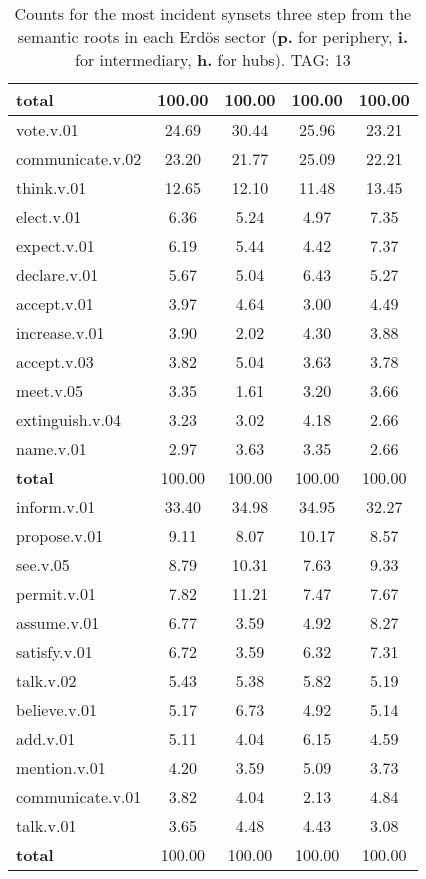 \begin{table}[h!]
\begin{center}
\begin{tabular}{| l || c | c | c | c |}
{{\bf total}} & 100.00  & 100.00  & 100.00  & 100.00 \\\hline\hline\hline
vote.v.01 & 24.69  & 30.44  & 25.96  & 23.21 \\\hline
communicate.v.02 & 23.20  & 21.77  & 25.09  & 22.21 \\\hline
think.v.01 & 12.65  & 12.10  & 11.48  & 13.45 \\\hline
elect.v.01 & 6.36  & 5.24  & 4.97  & 7.35 \\\hline
expect.v.01 & 6.19  & 5.44  & 4.42  & 7.37 \\\hline
declare.v.01 & 5.67  & 5.04  & 6.43  & 5.27 \\\hline
accept.v.01 & 3.97  & 4.64  & 3.00  & 4.49 \\\hline
increase.v.01 & 3.90  & 2.02  & 4.30  & 3.88 \\\hline
accept.v.03 & 3.82  & 5.04  & 3.63  & 3.78 \\\hline
meet.v.05 & 3.35  & 1.61  & 3.20  & 3.66 \\\hline
extinguish.v.04 & 3.23  & 3.02  & 4.18  & 2.66 \\\hline
name.v.01 & 2.97  & 3.63  & 3.35  & 2.66 \\\hline\hline
{{\bf total}} & 100.00  & 100.00  & 100.00  & 100.00 \\\hline\hline\hline
inform.v.01 & 33.40  & 34.98  & 34.95  & 32.27 \\\hline
propose.v.01 & 9.11  & 8.07  & 10.17  & 8.57 \\\hline
see.v.05 & 8.79  & 10.31  & 7.63  & 9.33 \\\hline
permit.v.01 & 7.82  & 11.21  & 7.47  & 7.67 \\\hline
assume.v.01 & 6.77  & 3.59  & 4.92  & 8.27 \\\hline
satisfy.v.01 & 6.72  & 3.59  & 6.32  & 7.31 \\\hline
talk.v.02 & 5.43  & 5.38  & 5.82  & 5.19 \\\hline
believe.v.01 & 5.17  & 6.73  & 4.92  & 5.14 \\\hline
add.v.01 & 5.11  & 4.04  & 6.15  & 4.59 \\\hline
mention.v.01 & 4.20  & 3.59  & 5.09  & 3.73 \\\hline
communicate.v.01 & 3.82  & 4.04  & 2.13  & 4.84 \\\hline
talk.v.01 & 3.65  & 4.48  & 4.43  & 3.08 \\\hline\hline
{{\bf total}} & 100.00  & 100.00  & 100.00  & 100.00 \\\hline
\end{tabular}
\caption{Counts for the most incident synsets three step from the semantic roots in each Erd\"os sector ({\bf p.} for periphery, {\bf i.} for intermediary, {\bf h.} for hubs). TAG: 13}
\end{center}
\end{table}